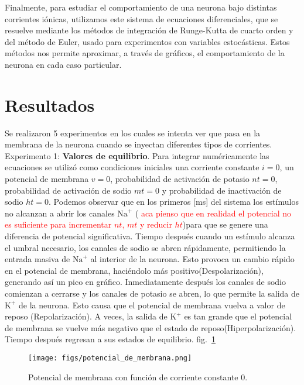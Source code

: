 \documentclass[aps,prl,twocolumn,groupedaddress]{revtex4-2}
\begin{document}
Finalmente, para estudiar el comportamiento de una neurona bajo distintas corrientes iónicas, utilizamos este sistema de ecuaciones diferenciales, que se resuelve mediante los métodos de integración de Runge-Kutta de cuarto orden
y del método de Euler, usado para experimentos con variables estocásticas.  Estos métodos nos permite aproximar, a través de gráficos, el comportamiento de la neurona en cada caso particular.



\section{Resultados}
Se realizaron 5 experimentos en los cuales se intenta ver que pasa en la membrana de la neurona cuando se inyectan diferentes tipos de corrientes.\\



Experimento 1: \textbf{Valores de equilibrio}. Para integrar numéricamente las ecuaciones se utilizó como condiciones iniciales una corriente constante $i=0$, un potencial de membrana $v=0$, probabilidad de activación de potasio $nt=0$, probabilidad de activación de sodio $mt=0$ y probabilidad de inactivación de sodio $ht =0$. Podemos observar que en los primeros [ms] del sistema los estímulos no alcanzan a abrir los canales $\mathrm{Na}^+$ (\textcolor{red}{ aca pienso que en realidad el potencial no es suficiente para incrementar $nt$, $mt$ y  reducir $ht$})para que se genere una diferencia de potencial significativa. Tiempo después cuando un estímulo alcanza el umbral necesario, los canales de sodio se abren rápidamente, permitiendo la entrada masiva de $\mathrm{Na}^+$ al interior de la neurona. Esto provoca un cambio rápido en el potencial de membrana, haciéndolo más positivo(Despolarización), generando así un pico en gráfico. Inmediatamente después los canales de sodio comienzan a cerrarse y los canales de potasio se abren, lo que permite la salida de $\mathrm{K}^+$ de la neurona. Esto causa que el potencial de membrana vuelva a valor de reposo (Repolarización). A veces, la salida de $\mathrm{K}^+$ es tan grande que el potencial de membrana se vuelve más negativo que el estado de reposo(Hiperpolarización). Tiempo después regresan a sus estados de equilibrio. fig.~\ref{fig1}\\

\begin{figure}[h!]
\centering
\texttt{[image: figs/potencial\_de\_membrana.png]}
\caption{Potencial de membrana con función de corriente constante 0. \label{fig1}}
\end{figure}
\end{document}
